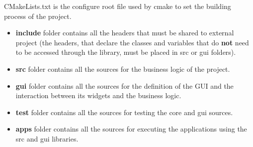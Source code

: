 CMakeLists.txt is the configure root file used by cmake to set the
building process of the project.

\begin{itemize}
  \tightlist
  \item
        \textbf{include} folder contains all the headers that must be shared
        to external project (the headers, that declare the classes and
        variables that do \textbf{not} need to be accessed through the
        library, must be placed in src or gui folders).
  \item
        \textbf{src} folder contains all the sources for the business logic of
        the project.
  \item
        \textbf{gui} folder contains all the sources for the definition of the
        GUI and the interaction between its widgets and the business logic.
  \item
        \textbf{test} folder contains all the sources for testing the core and
        gui sources.
  \item
        \textbf{apps} folder contains all the sources for executing the
        applications using the src and gui libraries.
\end{itemize}

